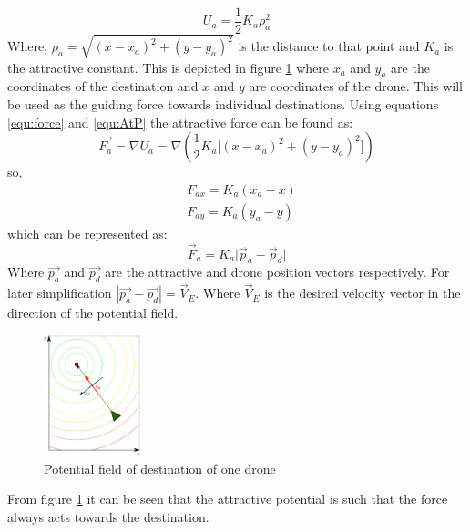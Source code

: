 \begin{equation}
    U_a=\frac{1}{2}K_a\rho_a^2
    \label{equ:AtP}
\end{equation}
\noindent
       Where, \(\rho_a = \sqrt{(x - x_a)^2 + (y - y_a)^2}\) is the distance to that point and \(K_a\) is the attractive constant. This is depicted in figure \ref{fig:Atractivepot} where \(x_a\) and \(y_a\) are the coordinates of the destination and \(x\) and \(y\) are coordinates of the drone. This will be used as the guiding force towards individual destinations. Using equations \ref{equ:force} and \ref{equ:AtP} the attractive force can be found as:
       \[\vec{F_a}=\nabla U_a = \nabla \left(\frac{1}{2}K_a\Big[(x - x_a)^2 + (y - y_a)^2\Big]\right)\]
       so,
       \begin{equation} \label{equ:AtractiveForce}
       \begin{split}
                &  F_{ax} = K_a(x_a - x) \\
                &  F_{ay} = K_a(y_a - y)
        \end{split}
       \end{equation}
       which can be represented as:
       \begin{equation}
           \vec{F}_a = K_a\vert\vec{p}_{a} - \vec{p}_{d}\vert
       \end{equation}
       \noindent
       Where $\vec{p_{a}}$ and $\vec{p_{d}}$ are the attractive and drone position vectors respectively. For later simplification $|\vec{p_{a}} - \vec{p_{d}}| = \vec{V}_E$. Where $\vec{V}_E$ is the desired velocity vector in the direction of the potential field.
       \begin{figure}[h]
    \centering
    \includegraphics[width=0.25\textwidth]{figures/AtractiveForce.png}
    \caption{Potential field of destination of one drone}
    \label{fig:Atractivepot}
\end{figure}

\noindent
From figure \ref{fig:Atractivepot} it can be seen that the attractive potential is such that the force always acts towards the destination.
\clearpage

